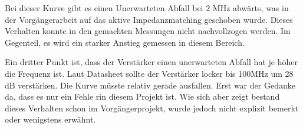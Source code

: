 Bei dieser Kurve gibt es einen Unerwarteten Abfall bei 2 MHz abwärts, was in der Vorgängerarbeit auf das aktive Impedanzmatching geschoben wurde. Dieses Verhalten konnte in den gemachten Messungen nicht nachvollzogen werden. Im Gegenteil, es wird ein starker Anstieg gemessen in diesem Bereich.

Ein dritter Punkt ist, dass der Verstärker einen unerwarteten Abfall hat je höher die Frequenz ist. Laut Datasheet sollte der Verstärker locker bis 100MHz um 28 dB verstärken. Die Kurve müsste relativ gerade ausfallen. Erst war der Gedanke da, dass es nur ein Fehle rin diesem Projekt ist. Wie sich aber zeigt bestand dieses Verhalten schon im Vorgängerprojekt, wurde jedoch nicht explizit bemerkt oder wenigstens erwähnt. 